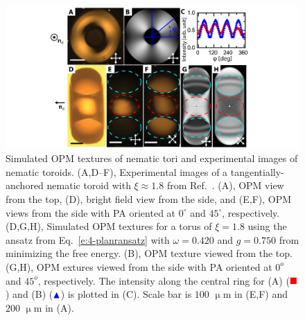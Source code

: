 \begin{figure}
\centering
\includegraphics{figures/C4/Ch4-Figs_PlanarToroids.png}
\caption{Simulated OPM textures of nematic tori and experimental images of nematic toroids. (A,D--F), Experimental images of a tangentially-anchored nematic toroid with $\xi \approx 1.8$ from Ref.~\cite{RN24}.
(A), OPM view from the top, (D), bright field view from the side, and (E,F), OPM views from the side with PA oriented at $0^{\circ}$ and $45^{\circ}$, respectively.
(D,G,H), Simulated OPM textures for a torus of $\xi = 1.8$ using the ansatz from Eq.~\ref{e:4-planransatz} with $\omega= 0.420$ and $g=0.750$ from minimizing the free energy.
(B), OPM texture viewed from the top.
(G,H), OPM extures viewed from the side with PA oriented at $0^o$ and $45^o$, respectively.
The intensity along the central ring for (A) ($\color{red}\blacksquare$) and (B) ($\color{blue}\blacktriangle$) is plotted in (C).
Scale bar is $100$ $\upmu$m in (E,F) and $200$ $\upmu$m in (A).}\label{f:4-PlanarTorusComparison}
\end{figure}

